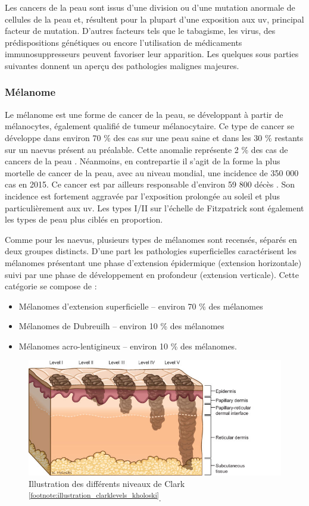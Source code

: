 Les cancers de la peau sont issus d’une division ou d’une mutation anormale de cellules de la peau et, résultent pour la plupart d’une exposition aux \gls{uv}, principal facteur de mutation. D’autres facteurs tels que le tabagisme, les virus, des prédispositions génétiques ou encore l’utilisation de médicaments immunosuppresseurs peuvent favoriser leur apparition. Les quelques sous parties suivantes donnent un aperçu des pathologies malignes majeures.\par

\subsubsection{Mélanome}
Le mélanome est une forme de cancer de la peau, se développant à partir de mélanocytes, également qualifié de tumeur mélanocytaire. Ce type de cancer se développe dans environ 70 \% des cas sur une peau saine et dans les 30 \% restants sur un naevus présent au préalable. Cette anomalie représente 2 \% des cas de cancers de la peau \cite{TortoraG;Derrickson2012}. Néanmoins, en contrepartie il s’agit de la forme la plus mortelle de cancer de la peau, avec au niveau mondial, une incidence de 350 000 cas en 2015. Ce cancer est par ailleurs responsable d’environ 59 800 décès \cite{Karimkhani2017}. Son incidence est fortement aggravée par l’exposition prolongée au soleil et plus particulièrement aux \gls{uv}. Les types I/II sur l’échelle de Fitzpatrick sont également les types de peau plus ciblés en proportion.\par

Comme pour les naevus, plusieurs types de mélanomes sont recensés, séparés en deux groupes distincts. D’une part les pathologies superficielles caractérisent les mélanomes présentant une phase d’extension épidermique (extension horizontale) suivi par une phase de développement en profondeur (extension verticale). Cette catégorie se compose de :
\begin{itemize}
\item Mélanomes d'extension superficielle – environ 70 \% des mélanomes
\item Mélanomes de Dubreuilh – environ 10 \% des mélanomes \cite{LeGal2011}
\item Mélanomes acro-lentigineux – environ 10 \% des mélanomes.
\end{itemize}
\begin{figure}[H]
    \centering
    \includegraphics[width=0.7\linewidth]{contents/chapter_1/resources/illustration_clarklevels_kholoski.png}
    \caption{Illustration des différents niveaux de Clark \cite{Clark1969} \textsuperscript{\ref{footnote:illustration_clarklevels_kholoski}}.}
    \label{fig:illustration_clarklevels_kholoski}
\end{figure}\par

